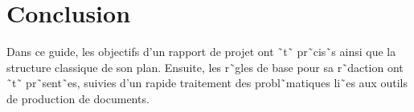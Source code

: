 \section{Conclusion}

Dans ce guide, les objectifs d'un rapport de projet ont
˜t˜ pr˜cis˜s ainsi que la structure classique de son plan. Ensuite,
les r˜gles de base pour sa r˜daction ont ˜t˜ pr˜sent˜es, suivies d'un
rapide traitement des probl˜matiques li˜es aux outils de production de
documents. 



